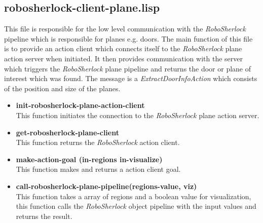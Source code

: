 \documentclass[main.tex]{subfiles}
\begin{document}
		\subsection{robosherlock-client-plane.lisp}
		This file is responsible for the low level communication with the \textit{RoboSherlock} pipeline which is responsible for planes e.g. doors. The main function of this file is to provide an action client which connects itself to the \textit{RoboSherlock} plane action server when initiated. It then provides communication with the server which triggers the \textit{RoboSherlock} plane pipeline and returns the door or plane of interest which was found. The message is a \textit{ExtractDoorInfoAction} which consists of the position and size of the planes.
		\begin{itemize}
			\item \textbf{init-robosherlock-plane-action-client} \\
			This function initiates the connection to the \textit{RoboSherlock} plane action server.
			\item \textbf{get-robosherlock-plane-client} \\
			This function returns the \textit{RoboSherlock} action client.
			\item \textbf{make-action-goal (in-regions in-visualize)} \\
			This function makes and returns a action client goal.
			\item \textbf{call-robosherlock-plane-pipeline(regions-value, viz)} \\
			This function takes a array of regions and a boolean value for visualization, this function calls the \textit{RoboSherlock} object pipeline with the input values and returns the result.
		\end{itemize}
	\endgroup
\end{document}
